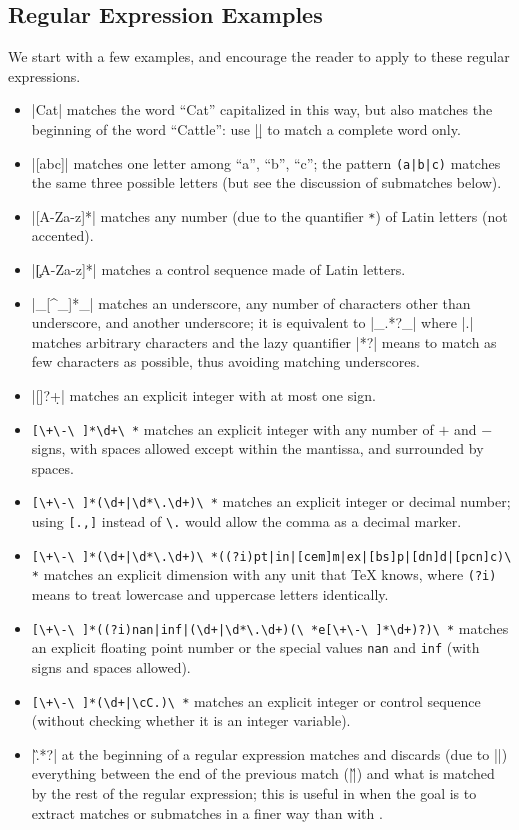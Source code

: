 \documentclass[oneside]{book}
\begin{document}
\subsection{Regular Expression Examples}

We start with a few examples, and encourage the reader to apply
 to these regular expressions.
\begin{itemize}
\item |Cat| matches the word \enquote{Cat} capitalized in this way,
  but also matches the beginning of the word \enquote{Cattle}: use
  |\bCat\b| to match a complete word only.
\item |[abc]| matches one letter among \enquote{a}, \enquote{b},
  \enquote{c}; the pattern \verb"(a|b|c)" matches the same three
  possible letters (but see the discussion of submatches below).
\item |[A-Za-z]*| matches any number (due to the quantifier
  \verb"*") of Latin letters (not accented).
\item |\c{[A-Za-z]*}| matches a control sequence made of Latin
  letters.
\item |\_[^\_]*\_| matches an underscore, any number of characters
  other than underscore, and another underscore; it is equivalent to
  |\_.*?\_| where |.| matches arbitrary characters and the
  lazy quantifier |*?| means to match as few characters as
  possible, thus avoiding matching underscores.
\item |[\+\-]?\d+| matches an explicit integer with at most one
  sign.
\item \verb*"[\+\-\ ]*\d+\ *" matches an explicit integer with any
  number of $+$ and $-$ signs, with spaces allowed except within the
  mantissa, and surrounded by spaces.
\item \verb*"[\+\-\ ]*(\d+|\d*\.\d+)\ *" matches an explicit integer or
  decimal number; using \verb*"[.,]" instead of \verb*"\." would allow
  the comma as a decimal marker.
\item
  \verb*"[\+\-\ ]*(\d+|\d*\.\d+)\ *((?i)pt|in|[cem]m|ex|[bs]p|[dn]d|[pcn]c)\ *"
  \allowbreak matches an explicit dimension with any unit that \TeX{} knows, where
  \verb*"(?i)" means to treat lowercase and uppercase letters
  identically.
\item \verb*"[\+\-\ ]*((?i)nan|inf|(\d+|\d*\.\d+)(\ *e[\+\-\ ]*\d+)?)\ *"
  matches an explicit floating point number or the special values
  \verb*"nan" and \verb*"inf" (with signs and spaces allowed).
\item \verb*"[\+\-\ ]*(\d+|\cC.)\ *" matches an explicit integer or
  control sequence (without checking whether it is an integer
  variable).
\item |\G.*?\K| at the beginning of a regular expression matches and
  discards (due to |\K|) everything between the end of the previous
  match (|\G|) and what is matched by the rest of the regular
  expression; this is useful in  when the
  goal is to extract matches or submatches in a finer way than with
  .
\end{itemize}
\end{document}
